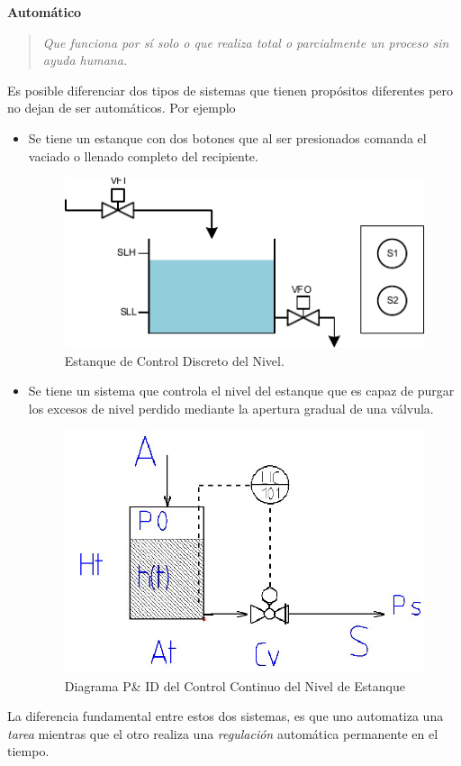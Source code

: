 \documentclass[letterpaper, 10pt]{report}
\begin{document}
\textbf{Automático}
\begin{quotation}
	\it
	Que funciona por sí solo o que realiza total o parcialmente un proceso sin ayuda humana.
\end{quotation}
\vspace{10pt}
Es posible diferenciar dos tipos de sistemas que tienen propósitos diferentes pero no dejan de ser automáticos. Por ejemplo 
\begin{itemize}
	\item Se tiene un estanque con dos botones que al ser presionados comanda el vaciado o llenado completo del recipiente.
	\begin{figure}[h]
		\centering
		\includegraphics[scale=0.8]{Estanque.pdf}
		\caption{Estanque de Control Discreto del Nivel.}	
	\end{figure}
	
	\item Se tiene un sistema que controla el nivel del estanque que es capaz de purgar los excesos de nivel perdido mediante la apertura gradual de una válvula.
	\begin{figure}[h]
		\centering
		\includegraphics[scale=0.23]{EstanqueControl.png}
		\caption{Diagrama P\& ID del Control Continuo del Nivel de Estanque}	
	\end{figure}

\end{itemize}	
	La diferencia fundamental entre estos dos sistemas, es que uno automatiza una \emph{tarea} mientras que el otro realiza una \emph{regulación} automática permanente en el tiempo.
	
\end{document}
